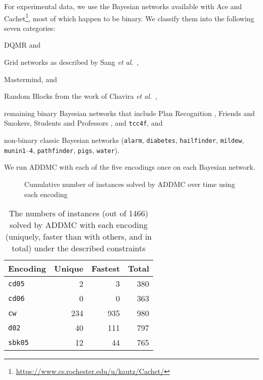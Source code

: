 \documentclass{article}
\newcommand{\etal}{\textit{et al}.}
\begin{document}
For experimental data, we use the Bayesian networks available with Ace and
Cachet\footnote{\url{https://www.cs.rochester.edu/u/kautz/Cachet/}}, most of
which happen to be binary. We classify them into the following seven categories:
\begin{itemize*}
\item DQMR and
\item Grid networks as described by Sang
  \etal{}~,
\item Mastermind, and
\item Random Blocks from the work of Chavira
  \etal{}~,
\item remaining binary Bayesian networks that include Plan Recognition
  \cite{DBLP:conf/aaai/SangBK05}, Friends and Smokers, Students and Professors
  \cite{DBLP:journals/ijar/ChaviraDJ06}, and \texttt{tcc4f}, and
\item non-binary classic Bayesian networks (\texttt{alarm}, \texttt{diabetes},
  \texttt{hailfinder}, \texttt{mildew}, \texttt{munin1}--\texttt{4},
  \texttt{pathfinder}, \texttt{pigs}, \texttt{water}).
\end{itemize*}
We run ADDMC with each of the five encodings once on each Bayesian network.

\begin{figure}
  \centering
  \caption{Cumulative number of instances solved by ADDMC over time using each
    encoding}
  \label{fig:cumulative}
\end{figure}

\begin{table}
  \centering
  \begin{tabular}{lrrr}
    \toprule
    Encoding & Unique & Fastest & Total \\
    \midrule
    \texttt{cd05} & 2 & 3 & 380 \\
    \texttt{cd06} & 0 & 0 & 363 \\
    \texttt{cw} & 234 & 935 & 980 \\
    \texttt{d02} & 40 & 111 & 797 \\
    \texttt{sbk05} & 12 & 44 & 765 \\
    \bottomrule
  \end{tabular}
  \caption{The numbers of instances (out of 1466) solved by ADDMC with each
    encoding (uniquely, faster than with others, and in total) under the
    described constraints}%
  \label{tbl:tallies}
\end{table}
\end{document}
